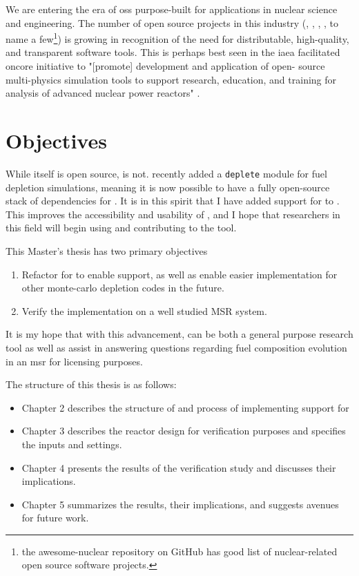     We are entering the era of \Gls{oss} purpose-built for applications in nuclear science and engineering. The number of open source projects in this industry (\ONIX\cite{de_troullioud_de_lanversin_onix_2021}, \OpenMC, \NJOYTWOONE\cite{noauthor_njoy21_2022}, \Cyclus\cite{noauthor_cyclus_2022}, to name a few\footnote{the awesome-nuclear repository on GitHub \cite{romano_awesome_2022} has good list of nuclear-related open source software projects.}) is growing in recognition of the need for
    distributable, high-quality, and transparent software tools. This is perhaps best seen in the \Gls{iaea} facilitated \Gls{oncore} initiative \cite{fiorina_initiative_2021} to "[promote] development and application of open- source multi-physics simulation tools to support research, education, and training for analysis of advanced nuclear power reactors"  \cite{iaea_open-source_2022}. 


\section{Objectives}%
\label{sec:objectives}

While \SaltProc itself is open source, \SerpentTWO is not. \OpenMC recently added a \verb.deplete. module for fuel depletion simulations, meaning it is now possible to have a fully open-source stack of dependencies for \SaltProc.  It is in this spirit that I have added support for \OpenMC to \SaltProc. This improves the accessibility and usability of \SaltProc, and I hope that researchers in this field will begin using and contributing to the tool.

This Master's thesis has two primary objectives
\begin{enumerate}
    \item Refactor \SaltProc for to enable \OpenMC support, as well as enable easier implementation for other monte-carlo depletion codes in the future. 
    \item Verify the implementation on a well studied MSR system.
\end{enumerate}

It is my hope that with this advancement, \SaltProc can be both a general purpose research tool as well as assist in answering questions regarding fuel composition evolution in an \Gls{msr} for licensing purposes. 

The structure of this thesis is as follows:
\begin{itemize}
    \item Chapter 2 describes the structure of \SaltProc and process of implementing support for \OpenMC
    \item Chapter 3 describes the reactor design for verification purposes and specifies the inputs and settings.
    \item Chapter 4 presents the results of the verification study and discusses their implications.
    \item Chapter 5 summarizes the results, their implications, and suggests avenues for future work.
\end{itemize}

